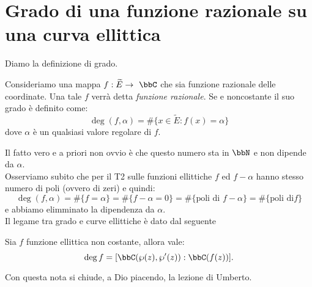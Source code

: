 \section{Grado di una funzione razionale su una curva ellittica}
Diamo la definizione di grado. 
\begin{definizione}
Consideriamo una mappa $f:\widetilde{E}\rar\ \bbC$ che sia funzione razionale delle coordinate. Una tale $f$ verrà detta {\it funzione razionale}. Se e noncostante il suo grado è definito come:
$$
\deg(f,\alpha)=\#\{x\in \widetilde{E}:f(x)=\alpha\}
$$
dove $\alpha$ è un qualsiasi valore regolare di $f$.
\end{definizione}
Il fatto vero e a priori non ovvio è che questo numero sta in $\bbN$ e non dipende da $\alpha$.\\
Osserviamo subito che per il T2 sulle funzioni ellittiche $f$ ed $f-\alpha$ hanno stesso numero di poli (ovvero di zeri) e quindi:
$$
\deg(f,\alpha)=\#\{f=\alpha\}=\#\{f-\alpha=0\}=\#\{\mbox{poli di } f-\alpha\}=\#\{\mbox{poli di} f\}
$$
e abbiamo elimminato la dipendenza da $\alpha$.\\
Il legame tra grado e curve ellittiche è dato dal seguente
\begin{esercizio}
Sia $f$ funzione ellittica non costante, allora vale:
$$
\deg f= [\bbC(\wp(z),\wp'(z)):\bbC(f(z))].
$$
\end{esercizio}
Con questa nota si chiude, a Dio piacendo, la lezione di Umberto.

